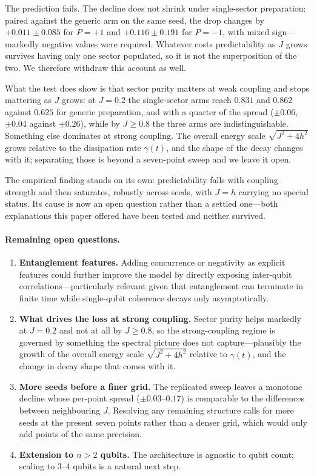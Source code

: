 \documentclass[twocolumn,10pt]{article}
\begin{document}
The prediction fails.
The decline does not shrink under single-sector preparation: paired
against the generic arm on the same seed, the drop changes by
$+0.011 \pm 0.085$ for $P={+}1$ and $+0.116 \pm 0.191$ for $P={-}1$,
with mixed sign---markedly negative values were required.
Whatever costs predictability as $J$ grows survives having only one
sector populated, so it is not the superposition of the two.
We therefore withdraw this account as well.

What the test does show is that sector purity matters at weak coupling
and stops mattering as $J$ grows: at $J=0.2$ the single-sector arms
reach $0.831$ and $0.862$ against $0.625$ for generic preparation, and
with a quarter of the spread ($\pm0.06$, $\pm0.04$ against $\pm0.26$),
while by $J\geq0.8$ the three arms are indistinguishable.
Something else dominates at strong coupling.
The overall energy scale $\sqrt{J^2+4h^2}$ grows relative to the
dissipation rate $\gamma(t)$, and the shape of the decay changes with
it; separating those is beyond a seven-point sweep and we leave it open.

The empirical finding stands on its own: predictability falls with
coupling strength and then saturates, robustly across seeds, with $J=h$
carrying no special status.
Its cause is now an open question rather than a settled one---both
explanations this paper offered have been tested and neither survived.

\paragraph{Remaining open questions.}
\begin{enumerate}
  \item \textbf{Entanglement features.}
    Adding concurrence \cite{Wootters1998} or negativity as explicit
    features could further improve the model by directly exposing
    inter-qubit correlations---particularly relevant given that
    entanglement can terminate in finite time \cite{YuEberly2009}
    while single-qubit coherence decays only asymptotically.
  \item \textbf{What drives the loss at strong coupling.}
    Sector purity helps markedly at $J=0.2$ and not at all by
    $J\geq0.8$, so the strong-coupling regime is governed by something
    the spectral picture does not capture---plausibly the growth of the
    overall energy scale $\sqrt{J^2+4h^2}$ relative to $\gamma(t)$, and
    the change in decay shape that comes with it.
  \item \textbf{More seeds before a finer grid.}
    The replicated sweep leaves a monotone decline whose per-point
    spread ($\pm 0.03$--$0.17$) is comparable to the differences between
    neighbouring $J$. Resolving any remaining structure calls for more
    seeds at the present seven points rather than a denser grid, which
    would only add points of the same precision.
  \item \textbf{Extension to $n > 2$ qubits.}
    The architecture is agnostic to qubit count; scaling to 3--4 qubits
    is a natural next step.
\end{enumerate}
\end{document}
